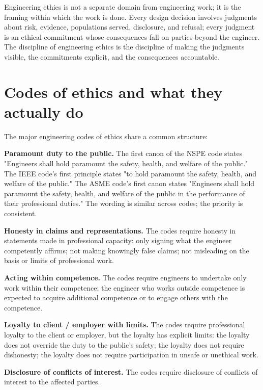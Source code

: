 \begin{principle}
Engineering ethics is not a separate domain from engineering work; it is the framing within which the work is done. Every design decision involves judgments about risk, evidence, populations served, disclosure, and refusal; every judgment is an ethical commitment whose consequences fall on parties beyond the engineer. The discipline of engineering ethics is the discipline of making the judgments visible, the commitments explicit, and the consequences accountable.
\end{principle}

\section{Codes of ethics and what they actually do}

The major engineering codes of ethics share a common structure:

\textbf{Paramount duty to the public.} The first canon of the NSPE code states "Engineers shall hold paramount the safety, health, and welfare of the public." The IEEE code's first principle states "to hold paramount the safety, health, and welfare of the public." The ASME code's first canon states "Engineers shall hold paramount the safety, health, and welfare of the public in the performance of their professional duties." The wording is similar across codes; the priority is consistent.

\textbf{Honesty in claims and representations.} The codes require honesty in statements made in professional capacity: only signing what the engineer competently affirms; not making knowingly false claims; not misleading on the basis or limits of professional work.

\textbf{Acting within competence.} The codes require engineers to undertake only work within their competence; the engineer who works outside competence is expected to acquire additional competence or to engage others with the competence.

\textbf{Loyalty to client / employer with limits.} The codes require professional loyalty to the client or employer, but the loyalty has explicit limits: the loyalty does not override the duty to the public's safety; the loyalty does not require dishonesty; the loyalty does not require participation in unsafe or unethical work.

\textbf{Disclosure of conflicts of interest.} The codes require disclosure of conflicts of interest to the affected parties.

